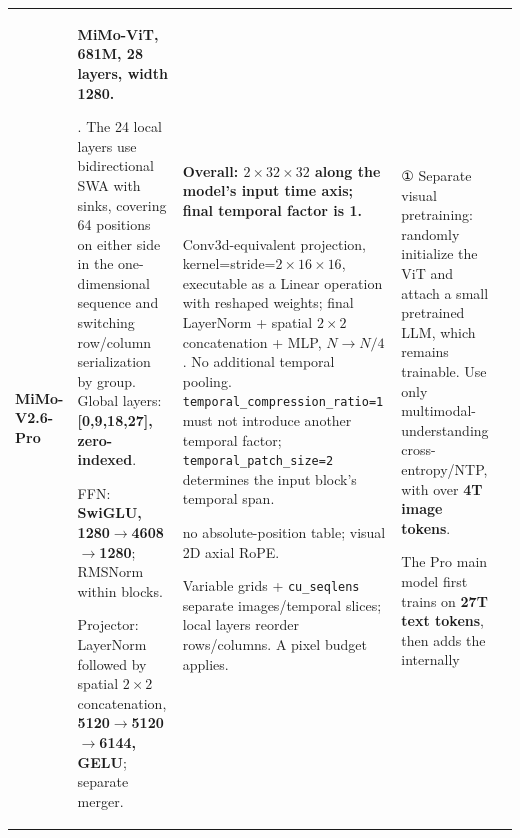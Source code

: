 \begin{longtable}{@{}P{0.100\dimexpr\textwidth-40pt\relax}P{0.230\dimexpr\textwidth-40pt\relax}P{0.290\dimexpr\textwidth-40pt\relax}P{0.240\dimexpr\textwidth-40pt\relax}P{0.140\dimexpr\textwidth-40pt\relax}@{}}
{\bfseries MiMo-\allowbreak{}V2.\allowbreak{}6-\allowbreak{}Pro} & {\bfseries MiMo-\allowbreak{}ViT, 681M, 28 layers, width 1280.\allowbreak{}}\par{}.\allowbreak{} The 24 local layers use bidirectional SWA with sinks, covering 64 positions on either side in the one-\allowbreak{}dimensional sequence and switching row/\allowbreak{}column serialization by group.\allowbreak{} Global layers: {\bfseries [0,9,18,27], zero-\allowbreak{}indexed}.\allowbreak{}\par\vspace{1pt}FFN: {\bfseries SwiGLU, 1280\(\rightarrow\)4608\(\rightarrow\)1280}; RMSNorm within blocks.\allowbreak{}\par\vspace{1pt}Projector: LayerNorm followed by spatial \(2\times 2\) concatenation, {\bfseries 5120\(\rightarrow\)5120\(\rightarrow\)6144, GELU}; separate merger.\allowbreak{} & {\bfseries Overall: \(2\times 32\times 32\) along the model's input time axis; final temporal factor is 1.\allowbreak{}}\par{} Conv3d-\allowbreak{}equivalent projection, kernel=\allowbreak{}stride=\allowbreak{}\(2\times 16\times 16\), executable as a Linear operation with reshaped weights; final LayerNorm + spatial \(2\times 2\) concatenation + MLP, {\bfseries \(N\rightarrow N/4\)}.\allowbreak{} No additional temporal pooling.\allowbreak{} \texttt{temporal\_\allowbreak{}compression\_\allowbreak{}ratio=\allowbreak{}1} must not introduce another temporal factor; \texttt{temporal\_\allowbreak{}patch\_\allowbreak{}size=\allowbreak{}2} determines the input block's temporal span.\allowbreak{}\par\vspace{1pt}{\bfseries Position:} no absolute-\allowbreak{}position table; visual 2D axial RoPE.\allowbreak{}\par{} Variable grids + \texttt{cu\_\allowbreak{}seqlens} separate images/\allowbreak{}temporal slices; local layers reorder rows/\allowbreak{}columns.\allowbreak{} A pixel budget applies.\allowbreak{} & {①} Separate visual pretraining: randomly initialize the ViT and attach a small pretrained LLM, which remains trainable.\allowbreak{} Use only multimodal-\allowbreak{}understanding cross-\allowbreak{}entropy/\allowbreak{}NTP, with over {\bfseries 4T image tokens}.\allowbreak{}\par{} The Pro main model first trains on {\bfseries 27T text tokens}, then adds the internally 
\end{longtable}
